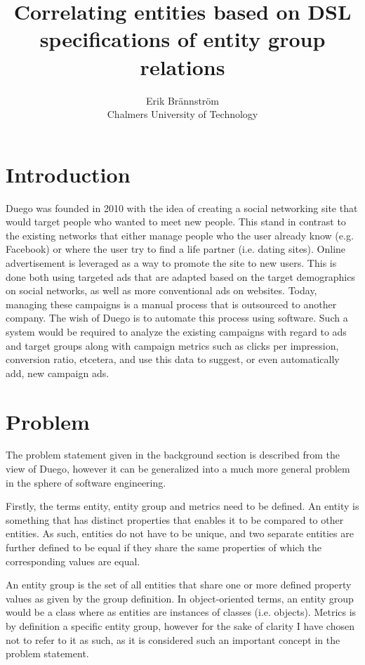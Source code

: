 \documentclass{article}
\begin{document}
\title{Correlating entities based on DSL specifications of entity group relations}
\author{Erik Brännström\\
  Chalmers University of Technology}
\date{}
\maketitle

\section{Introduction}
Duego was founded in 2010 with the idea of creating a social networking site that would target people who wanted to meet new people. This stand in contrast to the existing networks that either manage people who the user already know (e.g. Facebook) or where the user try to find a life partner (i.e. dating sites).
Online advertisement is leveraged as a way to promote the site to new users. This is done both using targeted ads that are adapted based on the target demographics on social networks, as well as more conventional ads on websites. Today, managing these campaigns is a manual process that is outsourced to another company.
The wish of Duego is to automate this process using software. Such a system would be required to analyze the existing campaigns with regard to ads and target groups along with campaign metrics such as clicks per impression, conversion ratio, etcetera, and use this data to suggest, or even automatically add, new campaign ads.

\section{Problem}
The problem statement given in the background section is described from the view of Duego, however it can be generalized into a much more general problem in the sphere of software engineering.

Firstly, the terms entity, entity group and metrics need to be defined. An entity is something that has distinct properties that enables it to be compared to other entities. As such, entities do not have to be unique, and two separate entities are further defined to be equal if they share the same properties of which the corresponding values are equal.

An entity group is the set of all entities that share one or more defined property values as given by the group definition. In object-oriented terms, an entity group would be a class where as entities are instances of classes (i.e. objects). Metrics is by definition a specific entity group, however for the sake of clarity I have chosen not to refer to it as such, as it is considered such an important concept in the problem statement.
\end{document}
